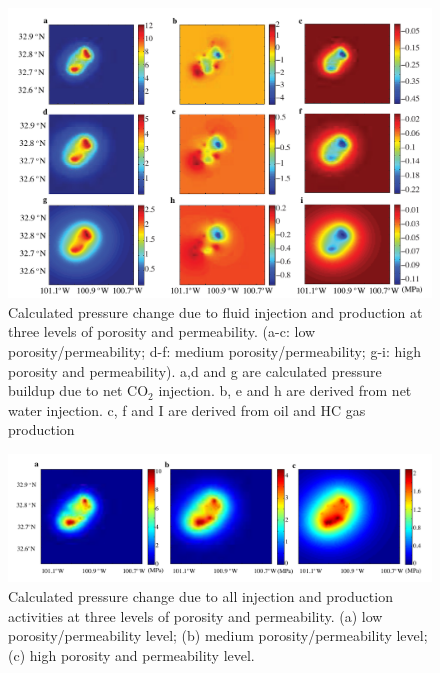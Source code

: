 \clearpage
\begin{figure}
	\centering
	\includegraphics[width=\textwidth]{figs_paper3/Fig7.pdf}	
	\caption[Calculated pressure change due to fluid injection and production at three levels of porosity and permeability.]{Calculated pressure change due to fluid injection and production at three levels of porosity and permeability. (a-c: low porosity/permeability; d-f: medium porosity/permeability; g-i: high porosity and permeability).  a,d and g are calculated pressure buildup due to net CO$_{2}$ injection.  b, e and h are derived from net water injection.  c, f and I are derived from oil and HC gas production}
	\label{fig:chpt5_fig7}
\end{figure}

\clearpage
\begin{figure}
	\centering
	\includegraphics[width=\textwidth]{figs_paper3/Fig8.pdf}	
	\caption[Calculated pressure change due to all injection and production activities at three levels of porosity and permeability.]{Calculated pressure change due to all injection and production activities at three levels of porosity and permeability. (a) low porosity/permeability level; (b) medium porosity/permeability level; (c) high porosity and permeability level.}
	\label{fig:chpt5_fig8}
\end{figure}

